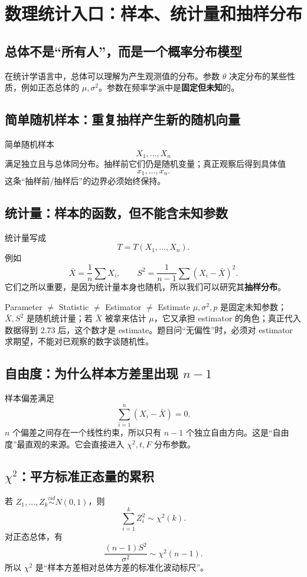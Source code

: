 \documentclass[11pt,a4paper,openany]{ctexbook}
\newcommand{\key}[1]{\textbf{\color{deep}#1}}
\begin{document}
\chapter{数理统计入口：样本、统计量和抽样分布}

\section{总体不是“所有人”，而是一个概率分布模型}
在统计学语言中，总体可以理解为产生观测值的分布。参数 $\theta$ 决定分布的某些性质，例如正态总体的 $\mu,\sigma^2$。参数在频率学派中是\key{固定但未知}的。

\section{简单随机样本：重复抽样产生新的随机向量}
简单随机样本
\[
X_1,\dots,X_n
\]
满足独立且与总体同分布。抽样前它们仍是随机变量；真正观察后得到具体值
\[
x_1,\dots,x_n.
\]
这条“抽样前/抽样后”的边界必须始终保持。

\section{统计量：样本的函数，但不能含未知参数}
统计量写成
\[
T=T(X_1,\dots,X_n).
\]
例如
\[
\bar X=\frac1n\sum X_i,
\qquad
S^2=\frac1{n-1}\sum(X_i-\bar X)^2.
\]
它们之所以重要，是因为统计量本身也随机，所以我们可以研究其\key{抽样分布}。

\begin{boundarybox}{Parameter $\neq$ Statistic $\neq$ Estimator $\neq$ Estimate}
$\mu,\sigma^2,p$ 是固定未知参数；$\bar X,S^2$ 是随机统计量；若 $\bar X$ 被拿来估计 $\mu$，它又承担 estimator 的角色；真正代入数据得到 2.73 后，这个数才是 estimate。题目问“无偏性”时，必须对 estimator 求期望，不能对已观察的数字谈随机性。
\end{boundarybox}

\section{自由度：为什么样本方差里出现 $n-1$}
样本偏差满足
\[
\sum_{i=1}^n(X_i-\bar X)=0.
\]
$n$ 个偏差之间存在一个线性约束，所以只有 $n-1$ 个独立自由方向。这是“自由度”最直观的来源。它会直接进入 $\chi^2,t,F$ 分布参数。

\section{$\chi^2$：平方标准正态量的累积}
若 $Z_1,\dots,Z_k\overset{iid}{\sim}N(0,1)$，则
\[
\sum_{i=1}^kZ_i^2\sim\chi^2(k).
\]
对正态总体，有
\[
\frac{(n-1)S^2}{\sigma^2}\sim\chi^2(n-1).
\]
所以 $\chi^2$ 是“样本方差相对总体方差的标准化波动标尺”。
\end{document}

